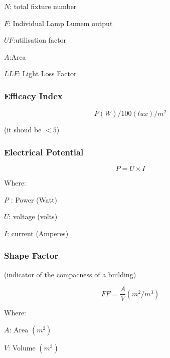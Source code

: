 \documentclass[]{book}
\theoremstyle{definition}
\theoremstyle{definition}
\theoremstyle{definition}
\theoremstyle{remark}
\begin{document}
\(N\): total fixture number

\(F\): Individual Lamp Lumem output

\(UF\):utilisation factor

\(A\):Area

\(LLF\): Light Loss Factor

\subsubsection{Efficacy Index}\label{efficacy-index}

\[P(W)/100 (lux)/m^2\]

(it shoud be \(<5\))

\subsubsection{Electrical Potential}\label{electrical-potential}

\[P = U\times I\]

Where:

\(P\) : Power (Watt)

\(U\): voltage (volts)

\(I\): current (Amperes)

\subsubsection{Shape Factor}\label{shape-factor}

(indicator of the compacness of a building)

\[FF= \frac{A}{V}(m^2/ m^3)\]

Where:

\(A\): Area \((m^2)\)

\(V\): Volume \((m^3)\)


\end{document}
